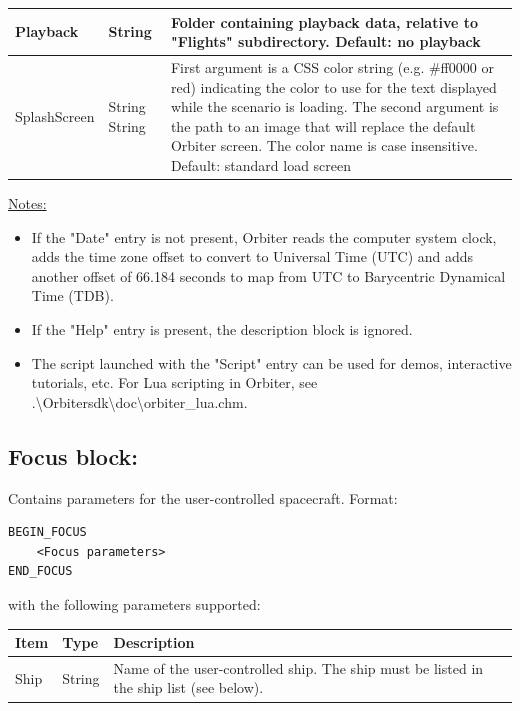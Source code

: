 \documentclass[Orbiter Developer Manual.tex]{subfiles}
\begin{document}
\begin{table}[H]
\begin{tabularx}{\textwidth}{ |l|l|X| }
	\hline\rule{0pt}{2ex}
	Playback & String & Folder containing playback data, relative to "Flights" subdirectory. Default: no playback\\
	\hline\rule{0pt}{2ex}
	SplashScreen & String String & First argument is a CSS color string (e.g. \#ff0000 or red) indicating the color to use for the text displayed while the scenario is loading. The second argument is the path to an image that will replace the default Orbiter screen. The color name is case insensitive. Default: standard load screen\\
	\hline
	\end{tabularx}
\end{table}

\noindent
\underline{Notes:}

\begin{itemize}
\item If the "Date" entry is not present, Orbiter reads the computer system clock, adds the time zone offset to convert to Universal Time (UTC) and adds another offset of 66.184 seconds to map from UTC to Barycentric Dynamical Time (TDB).
\item If the "Help" entry is present, the description block is ignored.
\item The script launched with the "Script" entry can be used for demos, interactive tutorials, etc. For Lua scripting in Orbiter, see .\textbackslash Orbitersdk\textbackslash doc\textbackslash orbiter\_lua.chm.
\end{itemize}


\subsection*{Focus block:}
Contains parameters for the user-controlled spacecraft. Format:

\begin{lstlisting}[language=OSFS]
BEGIN_FOCUS
	<Focus parameters>
END_FOCUS
\end{lstlisting}

\noindent
with the following parameters supported:

\begin{table}[H]
	\centering
	\begin{tabularx}{\textwidth}{ |l|l|X| }
	\hline\rule{0pt}{2ex}
	\textbf{Item} & \textbf{Type} & \textbf{Description}\\
	\hline\rule{0pt}{2ex}
	Ship & String & Name of the user-controlled ship. The ship must be listed in the ship list (see below).\\
	\hline
	\end{tabularx}
\end{table}
\end{document}

